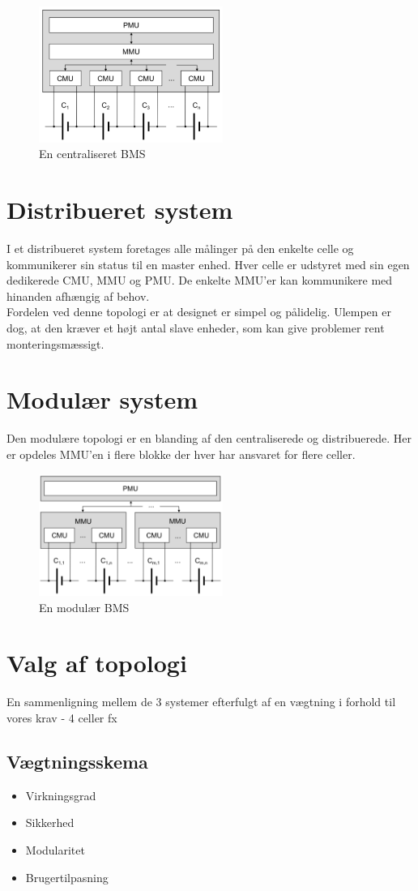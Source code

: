 \begin{figure}[h]
	\centering
	\includegraphics[width=6cm]{billeder/centralized.png}
	\caption{En centraliseret BMS}
	\label{fig:centralized_BMS}
\end{figure}

\section{Distribueret system}
I et distribueret system foretages alle målinger på den enkelte celle og kommunikerer sin status til en master enhed. Hver celle er udstyret med sin egen dedikerede CMU, MMU og PMU. De enkelte MMU'er kan kommunikere med hinanden afhængig af behov.
\\

Fordelen ved denne topologi er at designet er simpel og pålidelig. Ulempen er dog, at den kræver et højt antal slave enheder, som kan give problemer rent monteringsmæssigt.

\section{Modulær system}
Den modulære topologi er en blanding af den centraliserede og distribuerede. Her er opdeles MMU'en i flere blokke der hver har ansvaret for flere celler. 

\begin{figure}[h]
	\centering
	\includegraphics[width=6cm]{billeder/modular.png}
	\caption{En modulær BMS}
	\label{fig:modular_BMS}
\end{figure}


\section{Valg af topologi}
En sammenligning mellem de 3 systemer efterfulgt af en vægtning i forhold til vores krav - 4 celler fx
\subsection{Vægtningsskema}

\begin{itemize}
	\item Virkningsgrad
	\item Sikkerhed
	\item Modularitet
	\item Brugertilpasning
\end{itemize}